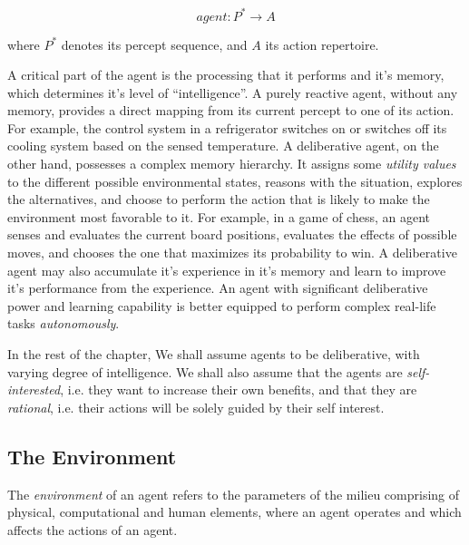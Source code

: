 \begin{equation}
	agent: P^* \rightarrow A
\end{equation}

\noindent
where $P^*$ denotes its percept sequence, and $A$ its action repertoire.

A critical part of the agent is the processing that it performs and it's memory, which determines it's level of ``intelligence''. 
A purely reactive agent, without any memory, provides a direct mapping from its current percept to one of its action. For example, 
the control system in a refrigerator switches on or switches off its cooling system based on the sensed temperature.
%
 
A deliberative agent, on the other hand, possesses a complex memory hierarchy. It assigns some {\em utility values} to the different 
possible environmental states, reasons with the situation, explores the alternatives, and choose to perform the action that is likely 
to make the environment most favorable to it. For example, in a game of chess, an agent senses and evaluates the current board positions,
evaluates the effects of possible moves, and chooses the one that maximizes its probability to win. 
%
A deliberative agent may also accumulate it's experience in it's memory and learn to improve it's performance from the experience. 
An agent with significant deliberative power and learning capability is better equipped to perform complex real-life tasks 
{\it autonomously}. 

 
In the rest of the chapter, We shall assume agents to be deliberative, with varying degree of intelligence. We shall also assume that
the agents are {\em self-interested}, i.e. they want to increase their own benefits, and that they are {\em rational}, i.e. their
actions will be solely guided by their self interest. 

\subsection{The Environment}
\label{sec:agents:environment}

\begin{definition} [environment]
	The {\em environment} of an agent refers to the parameters of the milieu comprising of physical, computational and human elements, 
	where an agent operates and which affects the actions of an agent. 
\end{definition}

